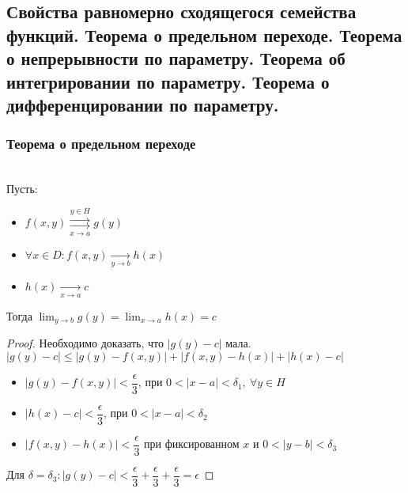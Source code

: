 \subsection{Свойства равномерно сходящегося семейства функций. Теорема о предельном переходе. Теорема о непрерывности по параметру. Теорема об интегрировании по параметру. Теорема о дифференцировании по параметру.}

\subsubsection{Теорема о предельном переходе}

\begin{theorem*} \ \\
    Пусть: 
    \begin{itemize}
        \item $f(x, y) \overset{y \in H}{\underset{x \to a}{\rightrightarrows}} g(y)$
        \item $\forall x \in D: f(x, y) \underset{y \to b}{\to} h(x)$
        \item $h(x) \underset{x \to a}{\to} c$
    \end{itemize}  
    Тогда $\displaystyle \lim_{y \to b} g(y) = \lim_{x \to a} h(x) = c$
\end{theorem*}
\begin{proof}
    Необходимо доказать, что $|g(y) - c|$ мала. \\
    $|g(y) - c| \leqslant |g(y) - f(x, y)| + |f(x, y) - h(x)| + |h(x) - c|$ \\
    \begin{itemize}
        \item $|g(y) - f(x, y)| < \dfrac{\epsilon}{3}$, при $ 0 < |x - a| < \delta_1, \ \forall y \in H$
        \item $|h(x) - c| < \dfrac{\epsilon}{3}$, при $0 < |x - a| < \delta_2$
        \item $|f(x, y) - h(x)| < \dfrac{\epsilon}{3}$ при фиксированном
         $x$ и  $0 < |y - b| < \delta_3$
    \end{itemize}  
    Для $\delta = \delta_3: |g(y) - c| < \dfrac{\epsilon}{3} + 
    \dfrac{\epsilon}{3} +  \dfrac{\epsilon}{3} = \epsilon$
\end{proof}
